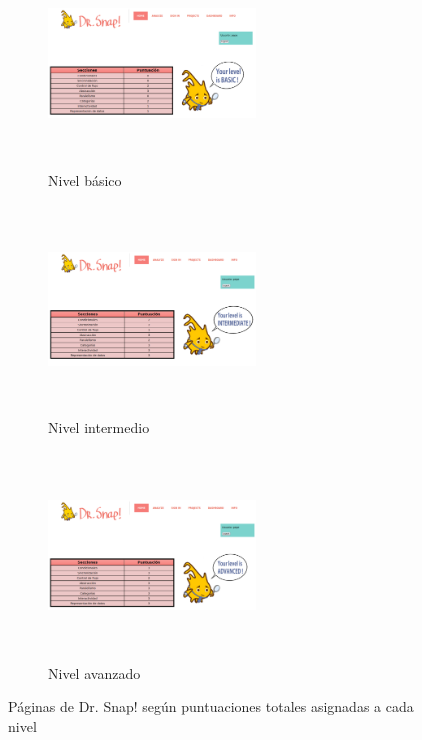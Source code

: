 \documentclass[a4paper, 12pt]{book}
\begin{document}
\begin{figure}[H]
    \centering
    \begin{subfigure}[h]{.325\textwidth} 
        \includegraphics[width=5.5cm,height=5.5cm,keepaspectratio]{img/basico_Snap}
        \caption{Nivel básico}
    \end{subfigure}       
    \begin{subfigure}[h]{.325\textwidth} 
        \includegraphics[width=5.5cm,height=5.5cm,keepaspectratio]{img/medio_Snap}
        \caption{Nivel intermedio}
    \end{subfigure}
    \begin{subfigure}[h]{.325\textwidth} 
        \includegraphics[width=5.5cm,height=5.5cm,keepaspectratio]{img/alto_Snap}
        \caption{Nivel avanzado}
    \end{subfigure}
    \caption{Páginas de Dr. Snap! según puntuaciones totales asignadas a cada nivel}
    \label{fig:dashboards_Snap}
\end{figure}
\end{document}
